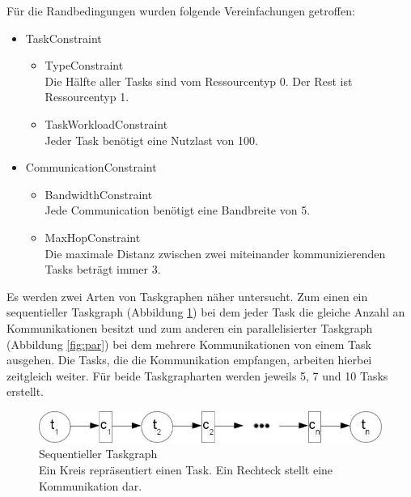 Für die Randbedingungen wurden folgende Vereinfachungen getroffen:
\begin{itemize}
\item TaskConstraint
\begin{itemize}
\item TypeConstraint\\
Die Hälfte aller Tasks sind vom Ressourcentyp 0. Der Rest ist Ressourcentyp 1.
\item TaskWorkloadConstraint \\
Jeder Task benötigt eine Nutzlast von 100.
\end{itemize}
\item CommunicationConstraint
\begin{itemize}
\item BandwidthConstraint\\
Jede Communication benötigt eine Bandbreite von 5.
\item MaxHopConstraint\\
Die maximale Distanz zwischen zwei miteinander kommunizierenden Tasks beträgt immer 3.
\end{itemize}
\end{itemize}

Es werden zwei Arten von Taskgraphen näher untersucht. Zum einen ein sequentieller Taskgraph (Abbildung \ref{fig:seq}) bei dem jeder Task die gleiche Anzahl an Kommunikationen besitzt und zum anderen ein parallelisierter Taskgraph (Abbildung \ref{fig:par}) bei dem mehrere Kommunikationen von einem Task ausgehen. Die Tasks, die die Kommunikation empfangen, arbeiten hierbei zeitgleich weiter. Für beide Taskgrapharten werden jeweils 5, 7 und 10 Tasks erstellt.
\begin{figure}[H]\centering
  \includegraphics[width = 120mm]{bilder/sequentiell.jpg}
  \caption{Sequentieller Taskgraph\\ Ein Kreis repräsentiert einen Task. Ein Rechteck stellt eine Kommunikation dar.
  }\label{fig:seq}
\end{figure}

